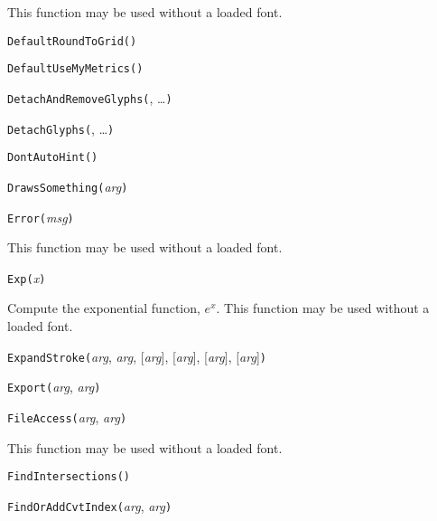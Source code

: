 This function may be used without a loaded font.


\noindent\texttt{DefaultRoundToGrid(}\texttt{)}


\noindent\texttt{DefaultUseMyMetrics(}\texttt{)}


\noindent\texttt{DetachAndRemoveGlyphs(}, \ldots\texttt{)}


\noindent\texttt{DetachGlyphs(}, \ldots\texttt{)}


\noindent\texttt{DontAutoHint(}\texttt{)}


\noindent\texttt{DrawsSomething(}\textit{arg}\texttt{)}


\noindent\texttt{Error(}\textit{msg}\texttt{)}

This function may be used without a loaded font.


\noindent\texttt{Exp(}\textit{x}\texttt{)}

Compute the exponential function, $e^x$.
This function may be used without a loaded font.


\noindent\texttt{ExpandStroke(}\textit{arg}, \textit{arg}, [\textit{arg}], [\textit{arg}], [\textit{arg}], [\textit{arg}]\texttt{)}


\noindent\texttt{Export(}\textit{arg}, \textit{arg}\texttt{)}


\noindent\texttt{FileAccess(}\textit{arg}, \textit{arg}\texttt{)}

This function may be used without a loaded font.


\noindent\texttt{FindIntersections(}\texttt{)}


\noindent\texttt{FindOrAddCvtIndex(}\textit{arg}, \textit{arg}\texttt{)}


